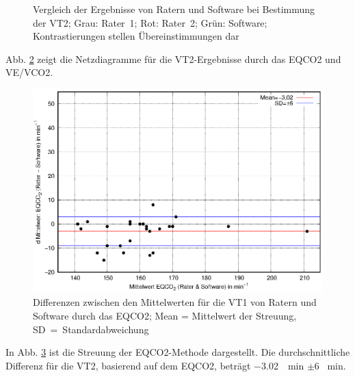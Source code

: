 \begin{figure}[H]
\begin{subfigure}[c]{0.45\textwidth}
		\label{subpic:pic4}
	\end{subfigure}
	\caption[Grafischer Vergleich der Ergebnisse für die VT2]{Vergleich der Ergebnisse von Ratern und Software bei Bestimmung der VT2; Grau: Rater~1; Rot: Rater~2; Grün: Software; Kontrastierungen stellen Übereinstimmungen dar}
	\label{pic:pic25}
\end{figure}
%
Abb. \ref{pic:pic25} zeigt die Netzdiagramme für die VT2-Ergebnisse durch das \gls{EQCO2} und \gls{VE}/\gls{VCO2}.

\begin{figure}[H]
	\centering
	\includegraphics[scale=0.95]{Bilder/eqco2.eps}
	\caption[Differenzen der \acrshort{EQCO2}-Ergebnisse zwischen Ratern und Software]{Differenzen zwischen den Mittelwerten für die VT1 von Ratern und Software durch das \acrshort{EQCO2}; Mean = Mittelwert der Streuung, SD~=~Standardabweichung}
	\label{pic:pic26}
\end{figure}
%
In Abb. \ref{pic:pic26} ist die Streuung der \gls{EQCO2}-Methode dargestellt. Die durchschnittliche Differenz für die VT2, basierend auf dem \gls{EQCO2}, beträgt \SI{-3,02}{\per\minute} $\pm$6 \si{\per\minute}.
%

